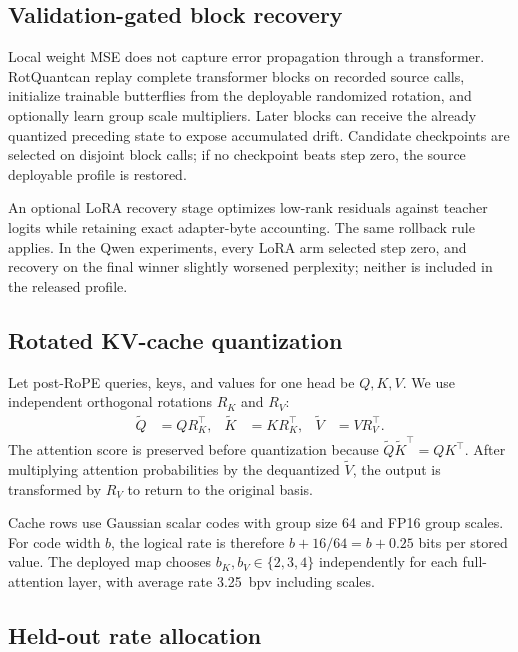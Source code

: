 \documentclass[10pt,twocolumn]{article}
\newcommand{\method}{RotQuant}
\begin{document}
\subsection{Validation-gated block recovery}

Local weight MSE does not capture error propagation through a transformer.
\method can replay complete transformer blocks on recorded source calls,
initialize trainable butterflies from the deployable randomized rotation, and
optionally learn group scale multipliers. Later blocks can receive the already
quantized preceding state to expose accumulated drift. Candidate checkpoints
are selected on disjoint block calls; if no checkpoint beats step zero, the
source deployable profile is restored.

An optional LoRA recovery stage \cite{hu2021lora} optimizes low-rank residuals
against teacher logits while retaining exact adapter-byte accounting. The same
rollback rule applies. In the Qwen experiments, every LoRA arm selected step
zero, and recovery on the final winner slightly worsened perplexity; neither is
included in the released profile.

\subsection{Rotated KV-cache quantization}

Let post-RoPE queries, keys, and values for one head be $Q,K,V$. We use
independent orthogonal rotations $R_K$ and $R_V$:
\begin{align}
  \widetilde Q &= QR_K^{\top}, &
  \widetilde K &= KR_K^{\top}, &
  \widetilde V &= VR_V^{\top}.
\end{align}
The attention score is preserved before quantization because
$\widetilde Q\widetilde K^{\top}=QK^{\top}$. After multiplying attention
probabilities by the dequantized $\widetilde V$, the output is transformed by
$R_V$ to return to the original basis.

Cache rows use Gaussian scalar codes with group size 64 and FP16 group scales.
For code width $b$, the logical rate is therefore $b+16/64=b+0.25$ bits per
stored value. The deployed map chooses $b_K,b_V\in\{2,3,4\}$ independently for
each full-attention layer, with average rate 3.25~bpv including scales.

\subsection{Held-out rate allocation}
\end{document}
